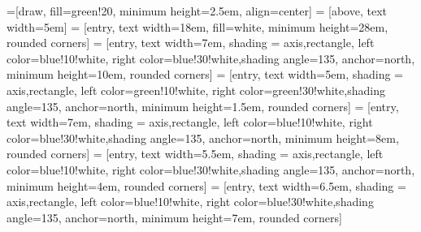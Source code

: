
\usetikzlibrary{calc,positioning}
\usetikzlibrary{arrows.meta}

=[draw, fill=green!20, minimum height=2.5em, align=center]
 = [above, text width=5em]
 = [entry, text width=18em, fill=white, 
minimum height=28em, rounded corners]
 = [entry, text width=7em, shading = axis,rectangle, left color=blue!10!white, right color=blue!30!white,shading angle=135, anchor=north,
minimum height=10em, rounded corners]
 = [entry, text width=5em, shading = axis,rectangle, left color=green!10!white, right color=green!30!white,shading angle=135, anchor=north,
minimum height=1.5em, rounded corners]
 = [entry, text width=7em, shading = axis,rectangle, left color=blue!10!white, right color=blue!30!white,shading angle=135, anchor=north,
minimum height=8em, rounded corners]
 = [entry, text width=5.5em, shading = axis,rectangle, left color=blue!10!white, right color=blue!30!white,shading angle=135, anchor=north,
minimum height=4em, rounded corners]
 = [entry, text width=6.5em, shading = axis,rectangle, left color=blue!10!white, right color=blue!30!white,shading angle=135, anchor=north,
minimum height=7em, rounded corners]
\def\blockdist{2.3}
\def\edgedist{2.5}

